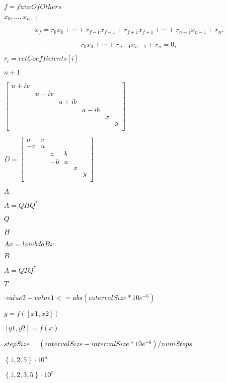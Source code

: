 \documentclass{article}
\begin{document}
$f=funcOfOthers$
\pagebreak

$x_0,\ldots,x_{n-1}$
\pagebreak

\[ x_f = r_0 x_0 + \cdots + r_{f-1}x_{f-1} + r_{f+1}x_{f+1} + \cdots + r_{n-1}x_{n-1} + r_n. \]
\pagebreak

\[ r_0 x_0 + \cdots + r_{n-1}x_{n-1} + r_n = 0, \]
\pagebreak

$r_i=retCoefficients[i]$
\pagebreak

$n+1$
\pagebreak

$ \left[ \begin{array}{cccccc} u+iv & & & & & \\ & u-iv & & & & \\ & & a+ib & & & \\ & & & a-ib & & \\ & & & & x & \\ & & & & & y \\ \end{array} \right] $
\pagebreak

$ D =\left[ \begin{array}{cccccc} u & v & & & & \\ -v & u & & & & \\ & & a & b & & \\ & & -b & a & & \\ & & & & x & \\ & & & & & y \\ \end{array} \right] $
\pagebreak

$ A $
\pagebreak

$ A = Q H Q^* $
\pagebreak

$ Q $
\pagebreak

$ H $
\pagebreak

$ Ax = lambda B x $
\pagebreak

$ B $
\pagebreak

$ A = Q T Q^* $
\pagebreak

$ T $
\pagebreak

$\cdot value2 - value1 <= abs(intervalSize * 10e^{-6})$
\pagebreak

$y = f([x1,x2])$
\pagebreak

$[y1,y2] = f(x)$
\pagebreak

$stepSize = (intervalSize - intervalSize * 10e^{-6}) / numSteps$
\pagebreak

$\left\{ 1,2,5\right\} \cdot 10^{n}$
\pagebreak

$\left\{ 1,2,3,5\right\} \cdot 10^{n}$
\pagebreak
\end{document}
